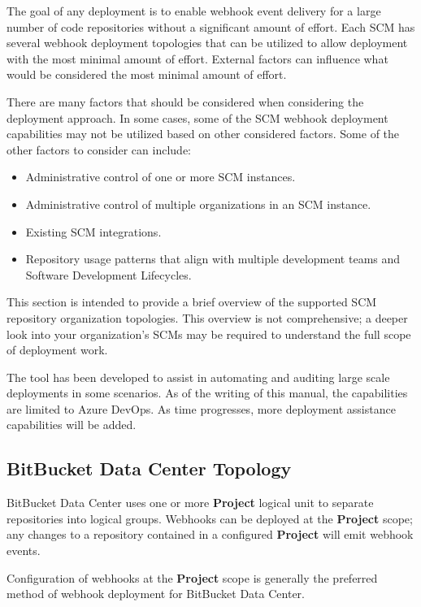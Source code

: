 The goal of any \cxoneflow deployment is to enable webhook event delivery for a
large number of code repositories without a significant amount of effort.  Each 
SCM has several webhook deployment topologies that can be utilized to allow
deployment with the most minimal amount of effort. External factors can influence
what would be considered the most minimal amount of effort.

There are many factors that should be considered when considering the deployment
approach.  In some cases, some of the SCM webhook deployment capabilities may
not be utilized based on other considered factors.  Some of the
other factors to consider can include:

\begin{itemize}
    \item Administrative control of one or more SCM instances.
    \item Administrative control of multiple organizations in an SCM instance.
    \item Existing SCM integrations.
    \item Repository usage patterns that align with multiple development teams and Software Development Lifecycles.
\end{itemize}

This section is intended to provide a brief overview of the supported SCM repository organization topologies.
This overview is not comprehensive; a deeper look into your organization's SCMs may be required
to understand the full scope of deployment work.

The tool  has been
developed to assist in automating and auditing large scale deployments in some scenarios.  As
of the writing of this manual, the capabilities are limited to Azure DevOps.  As time progresses,
more deployment assistance capabilities will be added.


\subsection{BitBucket Data Center Topology}

BitBucket Data Center uses one or more \textbf{Project} logical unit to separate repositories
into logical groups.  Webhooks can be deployed at the \textbf{Project} scope; any changes
to a repository contained in a configured \textbf{Project} will emit webhook events.

Configuration of webhooks at the \textbf{Project} scope is generally the preferred
method of webhook deployment for BitBucket Data Center.

